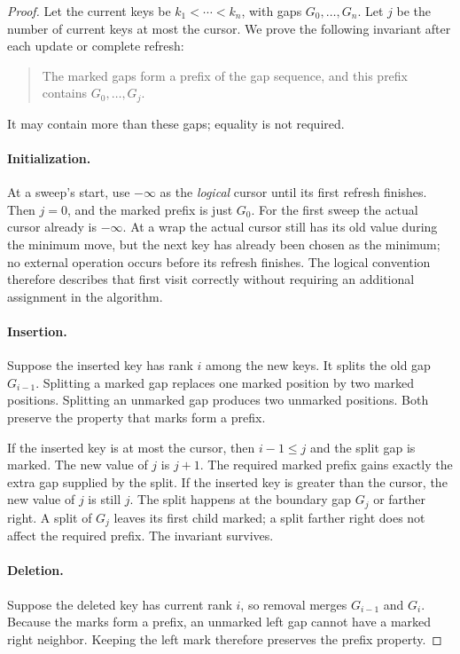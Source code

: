 \documentclass[11pt,a4paper]{article}
\theoremstyle{readable}
\begin{document}
\begin{proof}
Let the current keys be $k_1<\cdots<k_n$, with gaps $G_0,\ldots,G_n$.
Let $j$ be the number of current keys at most the cursor. We prove
the following invariant after each update or complete refresh:
\begin{quote}
The marked gaps form a prefix of the gap sequence, and this prefix
contains $G_0,\ldots,G_j$.
\end{quote}
It may contain more than these gaps; equality is not required.

\paragraph{Initialization.}
At a sweep's start, use $-\infty$ as the \emph{logical} cursor until
its first refresh finishes. Then $j=0$, and the marked prefix is just
$G_0$. For the first sweep the actual cursor already is $-\infty$.
At a wrap the actual cursor still has its old value during the minimum
move, but the next key has already been chosen as the minimum; no
external operation occurs before its refresh finishes. The logical
convention therefore describes that first visit correctly without
requiring an additional assignment in the algorithm.

\paragraph{Insertion.}
Suppose the inserted key has rank $i$ among the new keys. It splits
the old gap $G_{i-1}$. Splitting a marked gap replaces one marked
position by two marked positions. Splitting an unmarked gap produces
two unmarked positions. Both preserve the property that marks form a
prefix.

If the inserted key is at most the cursor, then $i-1\le j$ and the
split gap is marked. The new value of $j$ is $j+1$. The required
marked prefix gains exactly the extra gap supplied by the split.
If the inserted key is greater than the cursor, the new value of $j$
is still $j$. The split happens at the boundary gap $G_j$ or farther
right. A split of $G_j$ leaves its first child marked; a split farther
right does not affect the required prefix. The invariant survives.

\paragraph{Deletion.}
Suppose the deleted key has current rank $i$, so removal merges
$G_{i-1}$ and $G_i$. Because the marks form a prefix, an unmarked
left gap cannot have a marked right neighbor. Keeping the left mark
therefore preserves the prefix property.


\end{proof}
\end{document}
